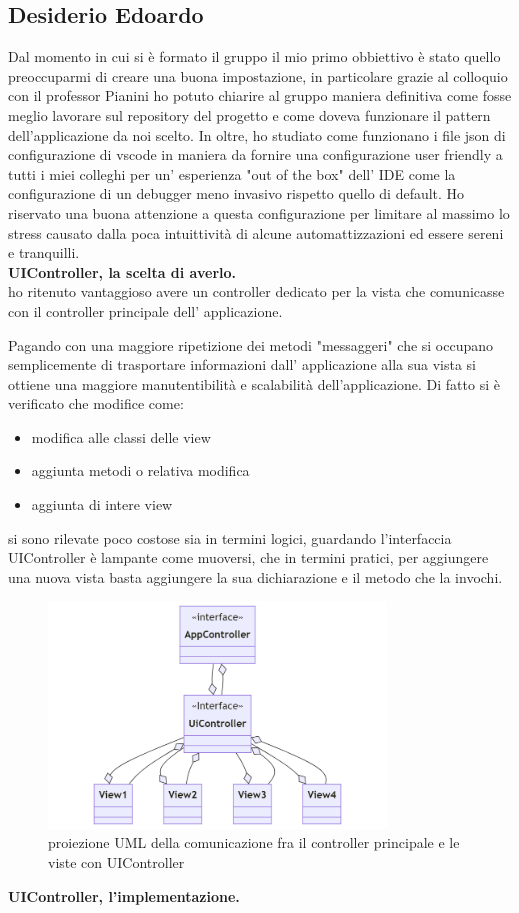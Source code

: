 \documentclass[a4paper,12pt]{report}
\begin{document}
\subsection{Desiderio Edoardo}
Dal momento in cui si è formato il gruppo il mio primo obbiettivo è stato quello preoccuparmi di creare una buona impostazione,
in particolare grazie al colloquio con il professor Pianini ho potuto chiarire al gruppo maniera definitiva come fosse meglio
lavorare sul repository del progetto e come doveva funzionare il pattern dell'applicazione da noi scelto.
In oltre, ho studiato come funzionano i file json di configurazione di vscode in maniera da fornire una configurazione user friendly
a tutti i miei colleghi per un' esperienza "out of the box" dell' IDE come la configurazione di un debugger meno invasivo rispetto quello di  default.
Ho riservato una buona attenzione a questa configurazione per limitare al massimo lo stress causato dalla poca intuittività di alcune
automattizzazioni ed essere sereni e tranquilli.\\
\textbf{UIController, la scelta di averlo.}\\
ho ritenuto vantaggioso avere un controller dedicato per la vista  che comunicasse
con il controller principale dell' applicazione.

Pagando con una maggiore ripetizione dei metodi "messaggeri" che si occupano semplicemente di trasportare informazioni
dall' applicazione alla sua vista si ottiene una maggiore manutentibilità e scalabilità dell'applicazione.
Di fatto si è verificato che modifice come:
\begin{itemize}
  \item modifica alle classi delle view
  \item aggiunta metodi o relativa modifica
  \item aggiunta di intere view
\end{itemize}
si sono rilevate poco costose sia in termini logici, guardando l'interfaccia UIController è lampante come muoversi,
che in termini pratici, per aggiungere una nuova vista basta aggiungere la sua dichiarazione e il metodo che la invochi.
\begin{figure}
  \centering
  \includegraphics[width=0.8\textwidth]{images/UiControllerDesing.png}
  \caption{proiezione UML della comunicazione fra il controller principale e le viste con UIController}
\end{figure}
\textbf{UIController, l'implementazione.}\\
\end{document}

